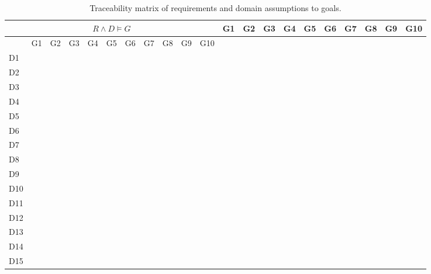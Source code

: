 \documentclass{article}
\begin{document}
\begin{longtable}[c]{|m{0.15cm}|m{0.15cm}|m{0.15cm}|m{0.15cm}|m{0.15cm}|m{0.15cm}|m{0.15cm}|m{0.15cm}|m{0.15cm}|m{0.15cm}|m{0.15cm}|}
 \caption{Traceability matrix of requirements and domain assumptions to goals.}
 \label{rg mapping}
 \hline
 \multicolumn{11}{|c|}{\cellcolor{white}$R \wedge D \vDash G$}
 \endfirsthead
 \hline
  \cellcolor{yellow!30} & \cellcolor{white}G1 & \cellcolor{white}G2 & \cellcolor{white}G3 & \cellcolor{white}G4 & \cellcolor{white}G5 & \cellcolor{white}G6 & \cellcolor{white}G7 & \cellcolor{white}G8 & \cellcolor{white}G9 & \cellcolor{white}G10 \\
 \endhead
 \endfoot
 \endlastfoot
 \hline
  \cellcolor{yellow!30} & \cellcolor{white}G1 & \cellcolor{white}G2 & \cellcolor{white}G3 & \cellcolor{white}G4 & \cellcolor{white}G5 & \cellcolor{white}G6 & \cellcolor{white}G7 & \cellcolor{white}G8 & \cellcolor{white}G9 & \cellcolor{white}G10 \\
 \hline
 D1 &   &   &   &   &   &   &   &   &   &   \\
 \hline
 D2 &   &   &   &   &   &   &   &   &   &   \\
 \hline
 D3 &   &   &   &   &   &   &   &   &   &   \\
 \hline
 D4 &   &   &   &   &   &   &   &   &   &   \\
 \hline
 D5 &   &   &   &   &   &   &   &   &   &   \\
 \hline
 D6 &   &   &   &   &   &   &   &   &   &   \\
 \hline
 D7 &   &   &   &   &   &   &   &   &   &   \\
 \hline
 D8 &   &   &   &   &   &   &   &   &   &   \\
 \hline
 D9 &   &   &   &   &   &   &   &   &   &   \\
 \hline
 D10 &   &   &   &   &   &   &   &   &   &   \\
 \hline
 D11 &   &   &   &   &   &   &   &   &   &   \\
 \hline
 D12 &   &   &   &   &   &   &   &   &   &   \\
 \hline
 D13 &   &   &   &   &   &   &   &   &   &   \\
 \hline
 D14 &   &   &   &   &   &   &   &   &   &   \\
 \hline
 D15 &   &   &   &   &   &   &   &   &   &   \\

\end{longtable}
\end{document}
